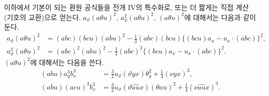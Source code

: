 
이하에서 기본이 되는 환원 공식들을 전개 IV의 특수화로, 또는 더 짧게는 직접 계산(기호의 교환)으로 얻는다. $a_\vartheta(a\theta u)^2$, $a_\vartheta^2(a\theta u)^2$, $(a\theta u)^2$에 대해서는 다음과 같이 둔다.
\[
\begin{aligned}
a_\vartheta(a\theta u)^2
&=(abc)(bcu)(abu)^2-\frac13(abc)(bcu)\{(bcu)a_x-u_x\cdot(abc)\}^2,\\
a_\vartheta^2(a\theta u)^2
&=(abc)^2(abu)^2-\frac13(abc)^2\{(bcu)a_x-u_x\cdot(abc)\}^2.
\end{aligned}
\]
$(a\theta u)^2$에 대해서는 다음을 쓴다.
\[
\begin{aligned}
(abu)a_y^3b_x^3&=\frac32u_\vartheta(\vartheta yx)\theta_y^2+\frac14(\nu yx)^3,\\
(abu)(acu)^3b_x^3&=\frac32u_\vartheta(\vartheta\widehat{au}x)(\theta au)^2+\frac14(\nu\widehat{au}x)^3.
\end{aligned}
\]
